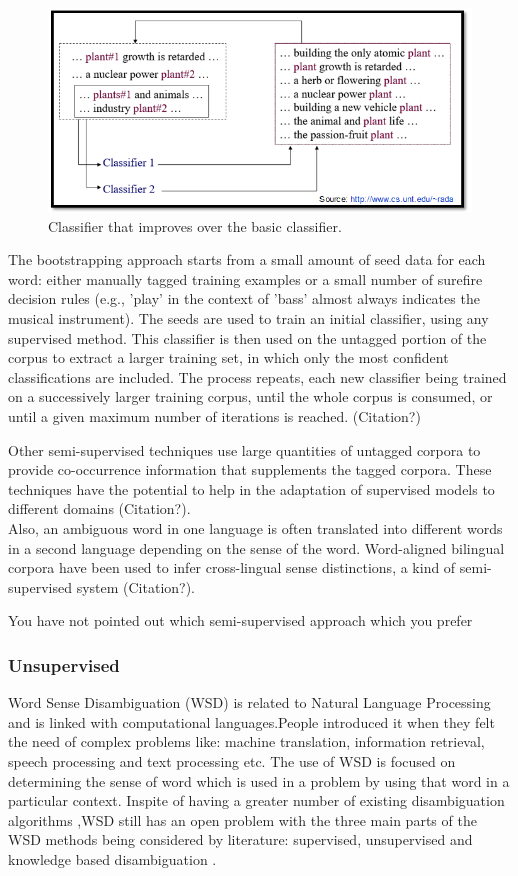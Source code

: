 \begin{figure}[tbh]
	\begin{center}
		\includegraphics[width=\columnwidth]{union(semi)}
	\end{center}
	\caption{Classifier that improves over the basic classifier. \label{fig3}}
\end{figure}

The bootstrapping approach starts from a small amount of seed data for each word: either manually tagged training examples or a small number of surefire decision rules (e.g., 'play' in the context of 'bass' almost always indicates the musical instrument). The seeds are used to train an initial classifier, using any supervised method. This classifier is then used on the untagged portion of the corpus to extract a larger training set, in which only the most confident classifications are included. The process repeats, each new classifier being trained on a successively larger training corpus, until the whole corpus is consumed, or until a given maximum number of iterations is reached. (Citation?)

Other semi-supervised techniques use large quantities of untagged corpora to provide co-occurrence information that supplements the tagged corpora. These techniques have the potential to help in the adaptation of supervised models to different domains (Citation?).\\
Also, an ambiguous word in one language is often translated into different words in a second language depending on the sense of the word. Word-aligned bilingual corpora have been used to infer cross-lingual sense distinctions, a kind of semi-supervised system (Citation?).

You have not pointed out which semi-supervised approach which you prefer

\subsubsection*{Unsupervised}
Word Sense Disambiguation (WSD) is related to Natural Language Processing and is linked with computational languages.People introduced it when they felt the need of complex problems like: machine translation, information retrieval, speech processing and text processing etc. The use of WSD is focused on determining the sense of word which is used in a problem by using that word in a particular context. Inspite of having a greater number of existing disambiguation algorithms ,WSD still has an open problem with the three main parts of the WSD methods being considered by literature: supervised, unsupervised and knowledge based disambiguation \cite{Guenther200312}.

